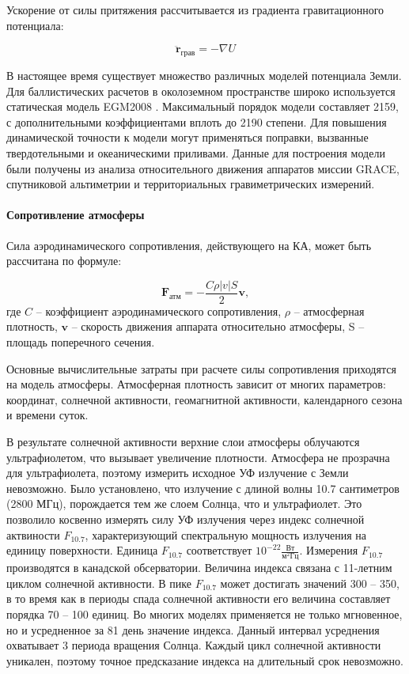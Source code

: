 Ускорение от силы притяжения рассчитывается из градиента гравитационного потенциала:

\begin{equation*}
    \ddot{\mathbf{r}}_{\text{грав}} = -\nabla U
\end{equation*}

В настоящее время существует множество различных моделей потенциала Земли.
Для баллистических расчетов в околоземном пространстве широко используется статическая модель EGM2008 \cite{pavlis2012}.
Максимальный порядок модели составляет 2159, с дополнительными коэффициентами вплоть до 2190 степени.
Для повышения динамической точности к модели могут применяться поправки, вызванные
твердотельными и океаническими приливами. Данные для построения модели были получены из
анализа относительного движения аппаратов миссии GRACE, спутниковой альтиметрии и 
территориальных гравиметрических измерений. 

\paragraph{Сопротивление атмосферы}

Сила аэродинамического сопротивления, действующего на КА, может быть рассчитана по формуле:

\begin{equation*}
    \mathbf{F}_{\text{атм}} = - \frac{C \rho |v| S}{2} \mathbf{v},
\end{equation*}
где $C$ -- коэффициент аэродинамического сопротивления, $\rho$ -- атмосферная плотность,
$\mathbf{v}$ -- скорость движения аппарата относительно атмосферы, S -- площадь поперечного сечения.

Основные вычислительные затраты при расчете силы сопротивления приходятся на модель атмосферы.
Атмосферная плотность зависит от многих параметров: координат, солнечной активности,
геомагнитной активности, календарного сезона и времени суток.

В результате солнечной активности верхние слои атмосферы облучаются ультрафиолетом,
что вызывает увеличение плотности. Атмосфера не прозрачна для ультрафиолета,
поэтому измерить исходное УФ излучение с Земли невозможно. Было установлено, что
излучение с длиной волны 10.7 сантиметров (2800 МГц), порождается тем же слоем Солнца, что и
ультрафиолет. Это позволило косвенно измерять силу УФ излучения через индекс
солнечной актвиности $F_{10.7}$, характеризующий спектральную мощность излучения на единицу поверхности. Единица $F_{10.7}$ соответствует
$10^{-22} \frac{\text{Вт}}{\text{м}^2 \text{Гц}}$. 
Измерения $F_{10.7}$ производятся в канадской обсерватории. 
Величина индекса связана с 11-летним циклом солнечной активности. 
В пике $F_{10.7}$ может достигать значений 300 -- 350, в то время как в периоды спада
солнечной активности его величина составляет порядка 70 -- 100 единиц. 
Во многих моделях применяется не только мгновенное, но и усредненное за 81 день значение индекса.
Данный интервал усреднения охватывает 3 периода вращения Солнца. 
Каждый цикл солнечной активности уникален, 
поэтому точное предсказание индекса на длительный срок невозможно.

